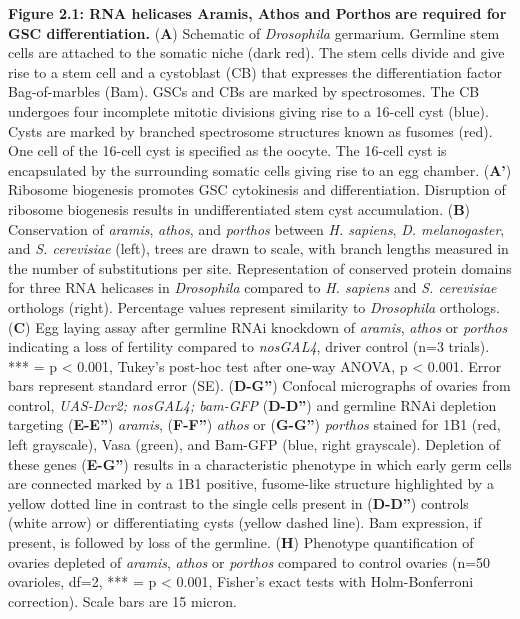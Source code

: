 \documentclass[12pt,twoside]{reedthesis}
\begin{document}
\textbf{Figure 2.1: RNA helicases Aramis, Athos and Porthos} \textbf{are required for
GSC differentiation.} (\textbf{A}) Schematic of \emph{Drosophila} germarium.
Germline stem cells are attached to the somatic niche (dark red). The
stem cells divide and give rise to a stem cell and a cystoblast (CB)
that expresses the differentiation factor Bag-of-marbles (Bam). GSCs and
CBs are marked by spectrosomes. The CB undergoes four incomplete mitotic
divisions giving rise to a 16-cell cyst (blue). Cysts are marked by
branched spectrosome structures known as fusomes (red). One cell of the
16-cell cyst is specified as the oocyte. The 16-cell cyst is
encapsulated by the surrounding somatic cells giving rise to an egg
chamber. (\textbf{A'}) Ribosome biogenesis promotes GSC cytokinesis and
differentiation. Disruption of ribosome biogenesis results in
undifferentiated stem cyst accumulation. (\textbf{B}) Conservation of
\emph{aramis}, \emph{athos}, and \emph{porthos} between \emph{H. sapiens}, \emph{D.
melanogaster}, and \emph{S. cerevisiae} (left), trees are drawn to scale,
with branch lengths measured in the number of substitutions per site.
Representation of conserved protein domains for three RNA helicases in
\emph{Drosophila} compared to \emph{H. sapiens} and \emph{S. cerevisiae} orthologs
(right). Percentage values represent similarity to \emph{Drosophila}
orthologs. (\textbf{C}) Egg laying assay after germline RNAi knockdown of
\emph{aramis}, \emph{athos} or \emph{porthos} indicating a loss of fertility compared
to \emph{nosGAL4}, driver control (n=3 trials). *** = p \textless{} 0.001, Tukey's
post-hoc test after one-way ANOVA, p \textless{} 0.001. Error bars represent
standard error (SE). (\textbf{D-G''}) Confocal micrographs of ovaries from
control, \emph{UAS-Dcr2; nosGAL4; bam-GFP} (\textbf{D-D''}) and germline RNAi
depletion targeting (\textbf{E-E''}) \emph{aramis}, (\textbf{F-F''}) \emph{athos} or
(\textbf{G-G''}) \emph{porthos} stained for 1B1 (red, left grayscale), Vasa
(green), and Bam-GFP (blue, right grayscale). Depletion of these genes
(\textbf{E-G''}) results in a characteristic phenotype in which early germ
cells are connected marked by a 1B1 positive, fusome-like structure
highlighted by a yellow dotted line in contrast to the single cells
present in (\textbf{D-D''}) controls (white arrow) or differentiating cysts
(yellow dashed line). Bam expression, if present, is followed by loss of
the germline. (\textbf{H}) Phenotype quantification of ovaries depleted of
\emph{aramis}, \emph{athos} or \emph{porthos} compared to control ovaries (n=50
ovarioles, df=2, *** = p \textless{} 0.001, Fisher's exact tests with
Holm-Bonferroni correction). Scale bars are 15 micron.
\end{document}
